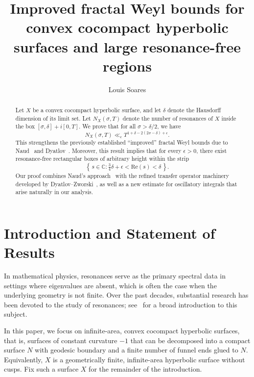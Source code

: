 \documentclass[12pt,letterpaper]{amsart}
\theoremstyle{plain}
\theoremstyle{definition}
\theoremstyle{remark}
\newcommand{\CC}{\mathbb{C}}
\begin{document}
\title[]{Improved fractal Weyl bounds for convex cocompact hyperbolic surfaces and large resonance-free regions}
\author[L.\@ Soares]{Louis Soares}


\begin{abstract}
Let $X$ be a convex cocompact hyperbolic surface, and let $\delta$ denote the Hausdorff dimension of its limit set. Let $N_X(\sigma,T)$ denote the number of resonances of $X$ inside the box $[\sigma, \delta] + i[0,T]$. We prove that for all $\sigma > \delta/2$, we have
\[
N_X(\sigma,T) \ll_\epsilon T^{1 + \delta - 2(2\sigma - \delta) + \epsilon}.
\]
This strengthens the previously established ``improved'' fractal Weyl bounds due to Naud~\cite{Naud14} and Dyatlov~\cite{Dya19}. Moreover, this result implies that for every $\epsilon > 0$, there exist resonance-free rectangular boxes of arbitrary height within the strip
\[
\left\{\, s \in \CC : \tfrac{3}{4}\delta + \epsilon < \mathrm{Re}(s) < \delta\, \right\}.
\]
Our proof combines Naud's approach~\cite{Naud14} with the refined transfer operator machinery developed by Dyatlov--Zworski~\cite{DyZw18}, as well as a new estimate for oscillatory integrals that arise naturally in our analysis.
\end{abstract}
\maketitle


\section{Introduction and Statement of Results}
In mathematical physics, resonances serve as the primary spectral data in settings where eigenvalues are absent, which is often the case when the underlying geometry is not finite. Over the past decades, substantial research has been devoted to the study of resonances; see~\cite{Zworski2017} for a broad introduction to this subject.

In this paper, we focus on infinite-area, convex cocompact hyperbolic surfaces, that is, surfaces of constant curvature $-1$ that can be decomposed into a compact surface $N$ with geodesic boundary and a finite number of funnel ends glued to $N$. 
Equivalently, $X$ is a geometrically finite, infinite-area hyperbolic surface without cusps. Fix such a surface $X$ for the remainder of the introduction.
\end{document}
